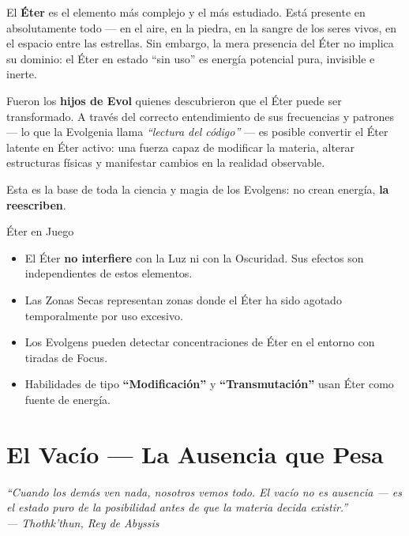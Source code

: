 \vspace{0.3cm}

El \textbf{Éter} es el elemento más complejo y el más estudiado. Está presente en absolutamente todo — en el aire, en la piedra, en la sangre de los seres vivos, en el espacio entre las estrellas. Sin embargo, la mera presencia del Éter no implica su dominio: el Éter en estado ``sin uso'' es energía potencial pura, invisible e inerte.

Fueron los \textbf{hijos de Evol} quienes descubrieron que el Éter puede ser transformado. A través del correcto entendimiento de sus frecuencias y patrones — lo que la Evolgenia llama \textit{``lectura del código''} — es posible convertir el Éter latente en Éter activo: una fuerza capaz de modificar la materia, alterar estructuras físicas y manifestar cambios en la realidad observable.

Esta es la base de toda la ciencia y magia de los Evolgens: no crean energía, \textbf{la reescriben}.

\begin{reglaespecial}{Éter en Juego}
\begin{itemize}
    \item El Éter \textbf{no interfiere} con la Luz ni con la Oscuridad. Sus efectos son independientes de estos elementos.
    \item Las Zonas Secas representan zonas donde el Éter ha sido agotado temporalmente por uso excesivo.
    \item Los Evolgens pueden detectar concentraciones de Éter en el entorno con tiradas de Focus.
    \item Habilidades de tipo \textbf{``Modificación''} y \textbf{``Transmutación''} usan Éter como fuente de energía.
\end{itemize}
\end{reglaespecial}

\section{El Vacío — La Ausencia que Pesa}

\begin{tcolorbox}[enhanced, colback=DeepBlack!95, colframe=VoidPurple!80,
    title={\color{VoidPurple!80}\textbf{EL VACÍO}},
    fonttitle=\large\bfseries,
    attach boxed title to top left={xshift=4mm, yshift=-2mm},
    boxed title style={colback=DeepBlack, colframe=VoidPurple}]
    \color{white}
    \itshape
    ``Cuando los demás ven nada, nosotros vemos todo. El vacío no es ausencia — es el estado puro de la posibilidad antes de que la materia decida existir.''\\[4pt]
    \hfill — \textit{Thothk'thun, Rey de Abyssis}
\end{tcolorbox}

